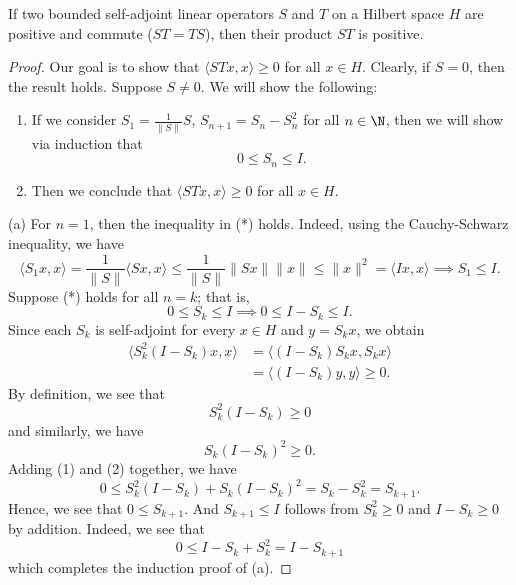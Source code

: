 \begin{theorem}
    If two bounded self-adjoint linear operators \( S  \) and \( T  \) on a Hilbert space \( H  \) are positive and commute (\( ST  = TS \)), then their product \( S T  \) is positive.
\end{theorem}
\begin{proof}
Our goal is to show that \( \langle ST x  , x  \rangle \geq 0  \) for all \( x \in H \). Clearly, if \( S = 0  \), then the result holds. Suppose \( S \neq 0  \). We will show the following:
\begin{enumerate}
    \item[(a)] If we consider \( {S}_{1} = \frac{ 1 }{ \|S\| }  S  \), \( {S}_{n+1} = {S}_{n} - {S}_{n}^{2} \) for all \( n \in \N \), then we will show via induction that 
        \[  0 \leq {S}_{n} \leq  I. \tag{*} \]
    \item[(b)] Then we conclude that \( \langle ST x  ,  x  \rangle \geq 0  \) for all \( x \in H  \). 
\end{enumerate}

(a) For \( n = 1  \), then the inequality in (*) holds. Indeed, using the Cauchy-Schwarz inequality, we have 
\[  \langle {S}_{1} x  ,  x  \rangle = \frac{ 1  }{  \|S \| }  \langle Sx  ,  x  \rangle \leq \frac{ 1  }{ \|S\| } \|Sx \| \|x \| \leq \|x\|^{2} = \langle Ix  ,  x  \rangle \implies {S}_{1} \leq I. \]
Suppose (*) holds for all \( n = k  \); that is, 
\[  0 \leq {S}_{k} \leq I \implies 0 \leq I - {S}_{k} \leq I. \]
Since each \( {S}_{k} \) is self-adjoint for every \( x \in H  \) and \( y = {S}_{k}x  \), we obtain
\begin{align*}
    \langle {S}_{k}^{2}(I - {S}_{k})x  ,  x  \rangle &= \langle (I - {S}_{k}){S}_{k}x  ,  {S}_{k } x  \rangle \\
                                                     &= \langle (I - {S}_{k}) y  , y \rangle \geq 0.
\end{align*}
By definition, we see that 
\[  {S}_{k}^{2} (I - {S}_{k}) \geq 0 \tag{1}  \]
and similarly, we have 
\[  {S}_{k}(I - {S}_{k})^{2} \geq 0.  \tag{2} \]
Adding (1) and (2) together, we have 
\[  0 \leq {S}_{k}^{2} (I - {S}_{k}) + {S}_{k}(I - {S}_{k})^{2} = {S}_{k} - {S}_{k}^{2} = {S}_{k+1}. \]
Hence, we see that \(  0 \leq {S}_{k+1}  \). And \( {S}_{k+1} \leq I  \) follows from \( {S}_{k}^{2} \geq 0  \) and \( I - {S}_{k} \geq 0  \) by addition. Indeed, we see that 
\[  0 \leq I - {S}_{k} + {S}_{k}^{2} = I - {S}_{k+1} \]
which completes the induction proof of (a).


\end{proof}
